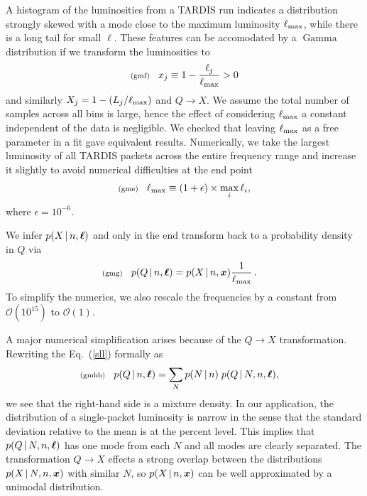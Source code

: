 \documentclass[11pt]{article}
\newcommand{\lleq}[1]{\label{#1} }
\renewcommand{\lleq}[1]{\label{#1} {\scriptstyle {\rm (#1)}} \hspace*{2ex} }
\newcommand{\cond}{\,|\,}
\newcommand{\refeq}[1]{Eq.~(\ref{#1})}
\DeclareMathOperator{\GammaDist}{Gamma}
\newcommand{\lmax}{\ell_{\rm max}}
\newcommand{\Lumtot}{Q}
\newcommand{\tardis}{TARDIS}
\begin{document}
A histogram of the luminosities from a \tardis{} run indicates a
distribution strongly skewed with a mode close to the maximum
luminosity $\lmax$, while there is a long tail for small $\ell$. These
features can be accomodated by a $\GammaDist$ distribution if we
transform the luminosities to
\begin{align}
  \lleq{gmf}
  x_j \equiv 1- \frac{\ell_j}{\lmax} > 0
\end{align}
and similarly $X_j = 1 - (L_j/\lmax)$ and $\Lumtot \to X$. We assume
the total number of samples across all bins is large, hence the effect
of considering $\lmax$ a constant independent of the data is
negligible. We checked that leaving $\lmax$ as a free parameter in a
fit gave equivalent results.
%
Numerically, we take the largest luminosity of all \tardis{} packets
across the entire frequency range and increase it slightly to avoid
numerical difficulties at the end point
\begin{align}
  \lleq{gme}
  \lmax \equiv (1+\epsilon) \times \max_i \ell_i,
\end{align}
where $ \epsilon=10^{-6}$.

We infer $p(X \cond n,\bml)$ and only in the end transform back to a
probability density in $\Lumtot$ via
\begin{align}
  \lleq{gmg}
  p(\Lumtot  \cond n, \bml)
  &= p(X  \cond n, \bmx) \frac{1}{\lmax} \,.
\end{align}
To simplify the numerics, we also rescale the frequencies by a
constant from $\mathcal{O}(10^{15})$ to $\mathcal{O}(1)$.  %



A major numerical simplification arises because of the $\Lumtot \to X$
transformation. Rewriting the \refeq{sll} formally as
\begin{align}
  \lleq{gmhb}
  p(Q  \cond n,\bml)
  & = \sum_{N} p(N \cond n)\; p(Q \cond N, n, \bml),
\end{align}
we see that the right-hand side is a mixture density. In our
application, the distribution of a single-packet luminosity is narrow
in the sense that the standard deviation relative to the mean is at
the percent level. This implies that $p(Q \cond N, n, \bml)$ has one
mode from each $N$ and all modes are clearly separated. The
transformation $\Lumtot \to X$ effects a strong overlap between the
distributions $p(X \cond N, n, \bmx)$ with similar $N$, so
$p(X \cond n, \bmx)$ can be well approximated by a unimodal
distribution.
\end{document}

